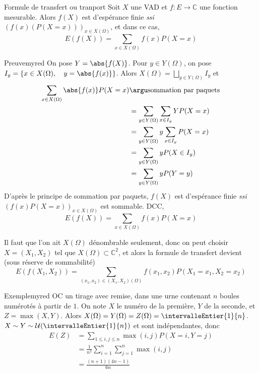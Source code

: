     \begin{theo}{Formule de transfert ou tranport}{}
        Soit $X$ une VAD et $f : E \to \mathbb{C}$ une fonction mesurable. Alors $f(X)$ est d’espérance finie \textit{ssi} $(f(x)(P(X = x)))_{x \in X(\Omega)}$, et dans ce cas, 
        \[ E(f(X)) = \sum_{x \in X(\Omega)} f(x) P(X = x) \] 
    \end{theo}

    \begin{demo}{Preuve}{myred}
        On pose $Y = \abs{f(X)}$. Pour $y \in Y(\Omega)$, on pose $I_y = \left\{x \in X(\Omega), \quad y = \abs{f(x)}\right\}$. Alors $X(\Omega) = \bigsqcup_{y \in Y(\Omega)} I_y$ et 
        \begin{align*}
            \sum_{x \in X(\Omega)} \abs{f(x)} P(X = x) 
            &\argu \text{sommation par paquets} \\
            &= \sum_{y \in Y(\Omega)} \sum_{x \in I_y} Y P(X = x) \\
            &= \sum_{y \in Y(\Omega)} y \sum_{x \in I_y} P(X = x) \\
            &= \sum_{y \in Y(\Omega)} y P(X \in I_y) \\
            &= \sum_{y \in Y(\Omega)} y P(Y = y)  
        \end{align*}
        D’après le principe de sommation par paquets, $f(X)$ est d’espérance finie \textit{ssi} $(f(x)P(X=x))_{x \in X(\Omega)}$ est sommable. DCC, 
        \[ E(f(X)) = \sum_{x \in X(\Omega)} f(x) P(X = x) \]    
    \end{demo}

    Il faut que l’on ait $X(\Omega)$ dénombrable seulement, donc on peut choisir $X = (X_1,X_2)$ tel que $X(\Omega) \subset \mathbb{C}^2$, et alors la formule de transfert devient (sous réserve de sommabilité)
    \[ E(f(X_1,X_2)) = \sum_{(x_1,x_2) \in (X_1,X_2)(\Omega)} f(x_1,x_2) P(X_1 = x_1,X_2 = x_2) \]  
    
    \begin{omed}{Exemple}{myred}
        OC un tirage avec remise, dans une urne contenant $n$ boules numérotés à partir de $1$. On note $X$ le numéro de la première, $Y$ de la seconde, et $Z = \max(X,Y)$. Alors $X(\Omega) = Y(\Omega) = Z(\Omega) = \intervalleEntier{1}{n}$. $X \sim Y \sim \mathcal{U}(\intervalleEntier{1}{n})$ et sont indépendantes, donc 
        \begin{align*}
            E(Z) &= \sum_{1 \leq i,j \leq n} \max(i,j) P(X=i, Y=j) \\
            &= \frac{1}{n^2} \sum_{i=1}^n \sum_{j=1}^{n} \max(i,j) \\
            &= \frac{(n+1)(4n-1)}{6n}
        \end{align*} 
    \end{omed}

